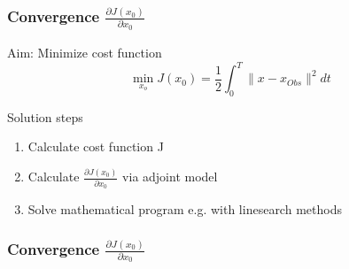 \begin{frame}[<+->]
  \frametitle{Convergence $\frac{\partial J(x_0)}{\partial x_0}$ }
	\begin{block}{Aim: Minimize cost function}
	\[
		\min_{x_o} J(x_0) = \frac{1}{2}\int_0^T \|x - x_{Obs}\|^2dt
	\]
	\end{block}
	\begin{block}{Solution steps}
	\begin{flushright}
	
	\end{flushright}
	
	\begin{enumerate}
	 \item Calculate cost function J
	 \item Calculate $\frac{\partial J(x_0)}{\partial x_0}$ via adjoint model
	 \item Solve mathematical program e.g. with linesearch methods
	\end{enumerate}
	\end{block}
\end{frame}
 
\begin{frame}[<+->]
  \frametitle{Convergence $\frac{\partial J(x_0)}{\partial x_0}$ }
  \begin{figure}
  \centering
  \end{figure}
\end{frame} 